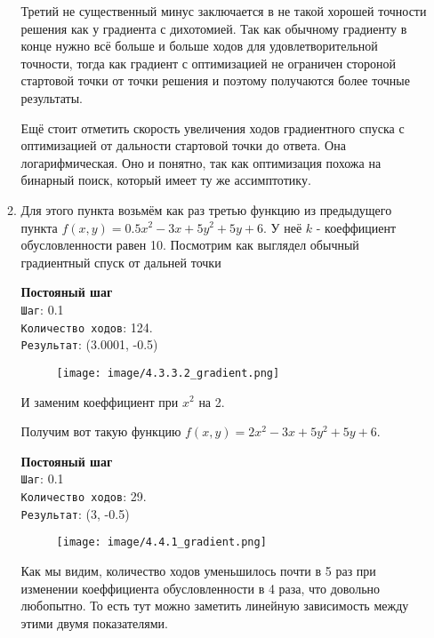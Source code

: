 \documentclass[12pt, a4paper]{article}
\begin{document}
\begin{enumerate}
\begin{enumerate}
    Третий не существенный минус заключается в не такой хорошей точности решения как у градиента с дихотомией. Так как обычному градиенту в конце нужно всё больше и больше ходов для удовлетворительной точности, тогда как градиент с оптимизацией не ограничен стороной стартовой точки от точки решения и поэтому получаются более точные результаты.

    Ещё стоит отметить скорость увеличения ходов градиентного спуска с оптимизацией от дальности стартовой точки до ответа. Она логарифмическая. Оно и понятно, так как оптимизация похожа на бинарный поиск, который имеет ту же ассимптотику.

    \item Для этого пункта возьмём как раз третью функцию из предыдущего пункта $f(x, y) = 0.5x^2 - 3x + 5y^2 + 5y + 6$. У неё $k$ - коеффициент обусловленности равен 10. Посмотрим как выглядел обычный градиентный спуск от дальней точки 

    \textbf{Постояный шаг}\\
    \texttt{Шаг}: 0.1\\
    \texttt{Количество ходов}: 124.\\
    \texttt{Результат}: (3.0001, -0.5)
    
    \begin{figure}[h]
    \centering
    \texttt{[image: image/4.3.3.2\_gradient.png]}
    \end{figure}

    И заменим коеффициент при $x^2$ на 2. 
    
    Получим вот такую функцию $f(x, y) = 2x^2 - 3x + 5y^2 + 5y + 6$.

    \textbf{Постояный шаг}\\
    \texttt{Шаг}: 0.1\\
    \texttt{Количество ходов}: 29.\\
    \texttt{Результат}: (3, -0.5)
    
    \begin{figure}[h]
    \centering
    \texttt{[image: image/4.4.1\_gradient.png]}
    \end{figure}

    Как мы видим, количество ходов уменьшилось почти в 5 раз при изменении коеффициента обусловленности в 4 раза, что довольно любопытно. То есть тут можно заметить линейную зависимость между этими двумя показателями.
    
\end{enumerate}


\end{enumerate}
\end{document}

